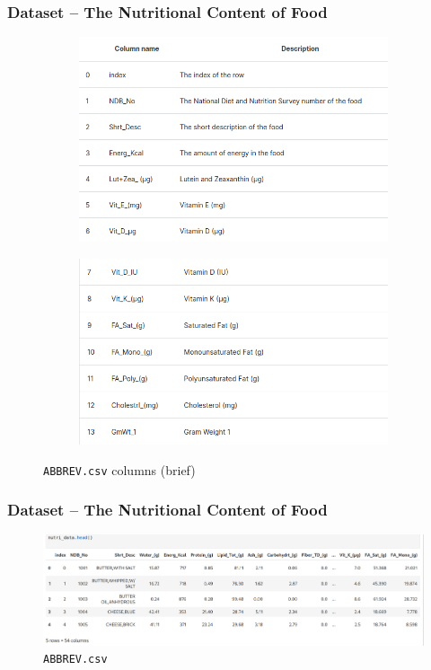 \documentclass{beamer}
\begin{document}
\begin{frame}
	\frametitle{Dataset -- The Nutritional Content of Food}
	\begin{figure}[H]
		\centering
		\begin{subfigure}[b]{0.48\linewidth}
			\includegraphics[width=\linewidth]{img/nutri_columns1.png}
		\end{subfigure}
		\begin{subfigure}[b]{0.48\linewidth}
			\includegraphics[width=\linewidth]{img/nutri_columns2.png}
		\end{subfigure}
		\caption{\texttt{ABBREV.csv} columns (brief)}
	\end{figure}
\end{frame}

\begin{frame}
	\frametitle{Dataset -- The Nutritional Content of Food}
	\begin{figure}[H]
		\centering
		\includegraphics[width=\linewidth]{img/nutri_head.png}
		\caption{\texttt{ABBREV.csv}}
	\end{figure}
\end{frame}
\end{document}
